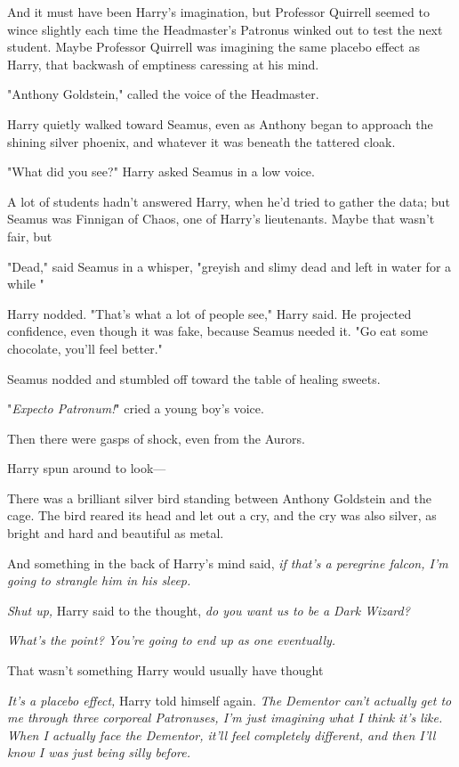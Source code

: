 And it must have been Harry's imagination, but Professor Quirrell seemed to
wince slightly each time the Headmaster's Patronus winked out to test the next
student. Maybe Professor Quirrell was imagining the same placebo effect as
Harry, that backwash of emptiness caressing at his mind.

"Anthony Goldstein," called the voice of the Headmaster.

Harry quietly walked toward Seamus, even as Anthony began to approach the
shining silver phoenix, and{\el} whatever it was beneath the tattered cloak.

"What did you see?" Harry asked Seamus in a low voice.

A lot of students hadn't answered Harry, when he'd tried to gather the data;
but Seamus was Finnigan of Chaos, one of Harry's lieutenants. Maybe that wasn't
fair, but{\el}

"Dead," said Seamus in a whisper, "greyish and slimy{\el} dead and left in
water for a while{\el} "

Harry nodded. "That's what a lot of people see," Harry said. He projected
confidence, even though it was fake, because Seamus needed it. "Go eat some
chocolate, you'll feel better."

Seamus nodded and stumbled off toward the table of healing sweets.

"\emph{Expecto Patronum!}" cried a young boy's voice.

Then there were gasps of shock, even from the Aurors.

Harry spun around to look—

There was a brilliant silver bird standing between Anthony Goldstein and the
cage. The bird reared its head and let out a cry, and the cry was also silver,
as bright and hard and beautiful as metal.

And something in the back of Harry's mind said, \emph{if that's a peregrine
falcon, I'm going to strangle him in his sleep.}

\emph{Shut up,} Harry said to the thought, \emph{do you want us to be a Dark
Wizard?}

\emph{What's the point? You're going to end up as one eventually.}

That{\el} wasn't something Harry would usually have thought{\el}

\emph{It's a placebo effect,} Harry told himself again. \emph{The Dementor
can't actually get to me through three corporeal Patronuses, I'm just imagining
what I think it's like. When I actually face the Dementor, it'll feel
completely different, and then I'll know I was just being silly before.}

